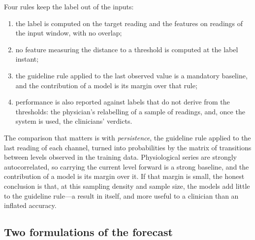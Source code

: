 \documentclass[11pt,a4paper,oneside]{report}
\begin{document}
Four rules keep the label out of the inputs:
\begin{enumerate}
  \item the label is computed on the target reading and the features on readings of the input window, with no overlap;
  \item no feature measuring the distance to a threshold is computed at the label instant;
  \item the guideline rule applied to the last observed value is a mandatory baseline, and the contribution of a model is its margin over that rule;
  \item performance is also reported against labels that do not derive from the thresholds: the physician's relabelling of a sample of readings, and, once the system is used, the clinicians' verdicts.
\end{enumerate}

The comparison that matters is with \emph{persistence}, the guideline rule applied to the last reading of each channel, turned into probabilities by the matrix of transitions between levels observed in the training data. Physiological series are strongly autocorrelated, so carrying the current level forward is a strong baseline, and the contribution of a model is its margin over it. If that margin is small, the honest conclusion is that, at this sampling density and sample size, the models add little to the guideline rule---a result in itself, and more useful to a clinician than an inflated accuracy.

\subsection{Two formulations of the forecast}
\end{document}
